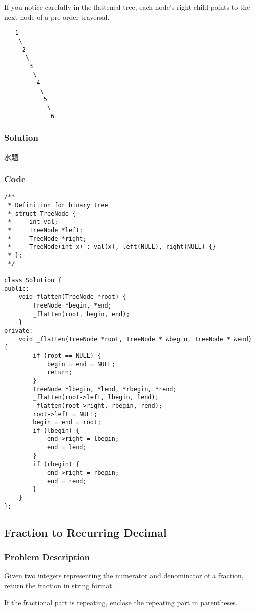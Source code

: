 \documentclass[courier]{article}
\begin{document}
\begin{CJK*}{UTF8}{gkai}
If you notice carefully in the flattened tree, each node's right child points to the next node of a pre-order traversal.

\begin{verbatim}
   1
    \
     2
      \
       3
        \
         4
          \
           5
            \
             6
\end{verbatim}


\subsubsection*{Solution}
水题

\subsubsection*{Code}
\begin{lstlisting}
/**
 * Definition for binary tree
 * struct TreeNode {
 *     int val;
 *     TreeNode *left;
 *     TreeNode *right;
 *     TreeNode(int x) : val(x), left(NULL), right(NULL) {}
 * };
 */

class Solution {
public:
    void flatten(TreeNode *root) {
        TreeNode *begin, *end;
        _flatten(root, begin, end);
    }
private:
    void _flatten(TreeNode *root, TreeNode * &begin, TreeNode * &end) {
        if (root == NULL) {
            begin = end = NULL;
            return;
        }
        TreeNode *lbegin, *lend, *rbegin, *rend;
        _flatten(root->left, lbegin, lend);
        _flatten(root->right, rbegin, rend);
        root->left = NULL;
        begin = end = root;
        if (lbegin) {
            end->right = lbegin;
            end = lend;
        }
        if (rbegin) {
            end->right = rbegin;
            end = rend;
        }
    }
};

\end{lstlisting}


\subsection{ Fraction to Recurring Decimal }

\subsubsection*{Problem Description}
Given two integers representing the numerator and denominator of a fraction, return the fraction in string format.

If the fractional part is repeating, enclose the repeating part in parentheses.


\end{CJK*}
\end{document}
